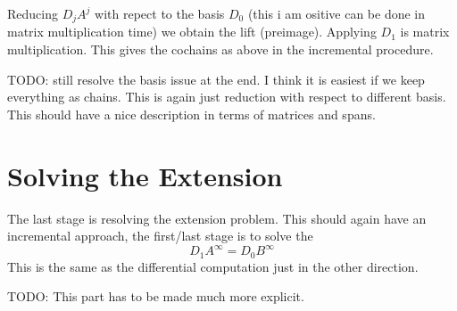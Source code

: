 \documentclass{amsart}
\begin{document}
Reducing $D_j A^j$ with repect to the basis $D_0$ (this i am ositive can be done in matrix multiplication time) we obtain the lift (preimage). Applying $D_1$ is matrix multiplication. This gives the cochains as above in the incremental procedure.

TODO: still resolve the basis issue at the end.  I think it is easiest if we keep everything as chains. This is again just reduction with respect to different basis.  This should have a nice description in terms of matrices and spans. 


\section{Solving the Extension}

The last stage is resolving the extension problem. 
This should again have an incremental approach, the first/last stage is to solve the 
$$ D_1 A^\infty = D_0 B^\infty$$
This is the same as the differential computation just in the other direction.


TODO: This part has to be made much more explicit. 
\end{document}
